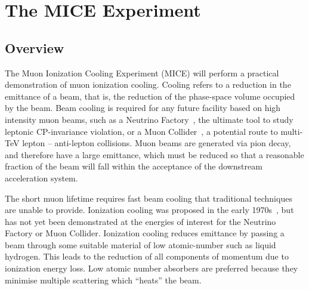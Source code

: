 \section{The MICE Experiment}
\label{sec:MICE}
  \subsection{Overview}
  \label{subsec:Overview}
  The Muon Ionization Cooling Experiment (MICE) will perform a practical demonstration of muon ionization cooling. Cooling refers to a reduction in the emittance of a beam, that is, the reduction of the phase-space volume occupied by the beam. Beam cooling is required for any future facility based on high intensity muon beams, such as a Neutrino Factory~\cite{ISS-Physics}, the ultimate tool to study leptonic CP-invariance violation, or a Muon Collider~\cite{MC_Overview}, a potential route to multi-TeV lepton -- anti-lepton collisions. Muon beams are generated via pion decay, and therefore have a large emittance, which must be reduced so that a reasonable fraction of the beam will fall within the acceptance of the downstream acceleration system.

  The short muon lifetime requires fast beam cooling that traditional techniques are unable to provide.  Ionization cooling was proposed in the early 1970s~\cite{Skrinsky, Neuffer}, but has not yet been demonstrated at the energies of interest for the Neutrino Factory or Muon Collider.  Ionization cooling reduces emittance by passing a beam through some suitable material of low atomic-number such as liquid hydrogen.  This leads to the reduction of all components of momentum due to ionization energy loss. Low atomic number absorbers are preferred because they minimise multiple scattering which ``heats'' the beam. %

